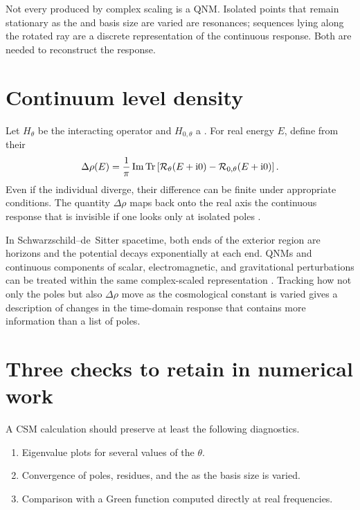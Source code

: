 \begin{principlebox}
Not every  produced by complex scaling is a QNM. Isolated points that remain stationary as the  and basis size are varied are resonances; sequences lying along the rotated ray are a discrete representation of the continuous response. Both are needed to reconstruct the response.
\end{principlebox}

\section{Continuum level density}

Let $H_\theta$ be the interacting operator and $H_{0,\theta}$ a . For real energy $E$, define from their 
\begin{equation}
\Delta\rho(E)
=
\frac{1}{\pi}
\operatorname{Im}\operatorname{Tr}\left[
\mathcal{R}_\theta(E+\mathrm{i}0)
-\mathcal{R}_{0,\theta}(E+\mathrm{i}0)
\right].
\label{eq:continuum-level-density}
\end{equation}
Even if the individual  diverge, their difference can be finite under appropriate conditions. The quantity $\Delta\rho$ maps back onto the real axis the continuous response that is invisible if one looks only at isolated poles \cite{Suzuki:2005wv}.

In Schwarzschild--de~Sitter spacetime, both ends of the exterior region are horizons and the potential decays exponentially at each end. QNMs and continuous components of scalar, electromagnetic, and gravitational perturbations can be treated within the same complex-scaled representation \cite{Ogawa:2026dSCSM}. Tracking how not only the poles but also $\Delta\rho$ move as the cosmological constant is varied gives a description of changes in the time-domain response that contains more information than a list of poles.

\section{Three checks to retain in numerical work}

A CSM calculation should preserve at least the following diagnostics.

\begin{enumerate}[label=(\roman*),leftmargin=2.8em]
\item Eigenvalue plots for several values of the  $\theta$.
\item Convergence of poles, residues, and the  as the basis size is varied.
\item Comparison with a Green function computed directly at real frequencies.
\end{enumerate}

